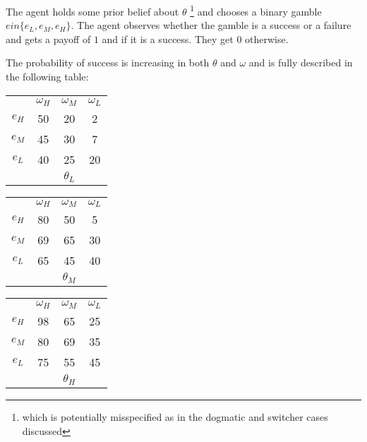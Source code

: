 \documentclass[
  12pt,
]{article}
\begin{document}
The agent holds some prior belief about \(\theta\)
\footnote{which is potentially misspecified as in the dogmatic and switcher cases discussed}
and chooses a binary gamble \(e in \{e_L, e_M, e_H\}\). The agent
observes whether the gamble is a success or a failure and gets a payoff
of \(1\) and if it is a success. They get \(0\) otherwise.

The probability of success is increasing in both \(\theta\) and
\(\omega\) and is fully described in the following table:

\begin{tabular}{ c|c|c|c|}
  
  \multicolumn{1}{c}{} & \multicolumn{1}{c}{$\omega_H$} & \multicolumn{1}{c}{$\omega_M$} & \multicolumn{1}{c}{$\omega_L$}\\
  \cline{2-4}
  $e_H$ & 50 & 20 & 2 \\
  \cline{2-4}
  $e_M$ & 45 & 30 & 7 \\
  \cline{2-4}
  $e_L$ & 40 & 25 & 20 \\

  \cline{2-4}
  \multicolumn{1}{c}{} & \multicolumn{1}{c}{} & \multicolumn{1}{c}{$\theta_L$} & \multicolumn{1}{c}{}\\
\end{tabular}
\hspace{.3cm} 
\begin{tabular}{ c|c|c|c|}
  
  \multicolumn{1}{c}{} & \multicolumn{1}{c}{$\omega_H$} & \multicolumn{1}{c}{$\omega_M$} & \multicolumn{1}{c}{$\omega_L$}\\
  \cline{2-4}
  $e_H$ & 80 & 50 & 5 \\
  \cline{2-4}
  $e_M$ & 69 & 65 & 30 \\
  \cline{2-4}
  $e_L$ & 65 & 45 & 40 \\
  \cline{2-4}
  \multicolumn{1}{c}{} & \multicolumn{1}{c}{} & \multicolumn{1}{c}{$\theta_M$} & \multicolumn{1}{c}{}\\
\end{tabular}
\hspace{.3cm} 
\begin{tabular}{ c|c|c|c|}
  
  \multicolumn{1}{c}{} & \multicolumn{1}{c}{$\omega_H$} & \multicolumn{1}{c}{$\omega_M$} & \multicolumn{1}{c}{$\omega_L$}\\
  \cline{2-4}
  $e_H$ & 98 & 65 & 25 \\
  \cline{2-4}
  $e_M$ & 80 & 69 & 35 \\
  \cline{2-4}
  $e_L$ & 75 & 55 & 45 \\
  \cline{2-4}
  \multicolumn{1}{c}{} & \multicolumn{1}{c}{} & \multicolumn{1}{c}{$\theta_H$} & \multicolumn{1}{c}{}\\
\end{tabular}
\end{document}
